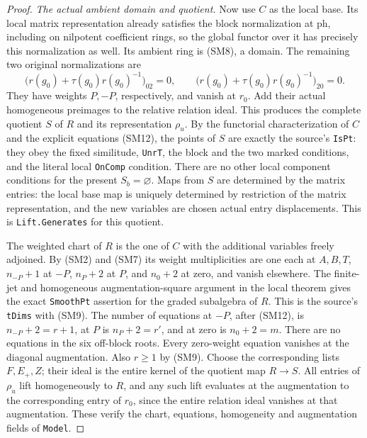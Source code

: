 \begin{proof}
\emph{The actual ambient domain and quotient.}
Now use \(C\) as the local base. Its local matrix
representation already satisfies the block
normalization at \(\mathrm{ph}\), including on
nilpotent coefficient rings, so the global functor
over it has precisely this normalization as well.
Its ambient ring is (SM8), a domain. The remaining
two original normalizations are
\[
 \bigl(r(g_0)+\tau(g_0)r(g_0)^{-1}\bigr)_{02}=0,\qquad
 \bigl(r(g_0)+\tau(g_0)r(g_0)^{-1}\bigr)_{20}=0 .
                                                               \tag{SM12}
\]
They have weights \(P,-P\), respectively, and vanish
at \(r_0\). Add their actual homogeneous preimages
to the relative relation ideal. This produces the
complete quotient \(S\) of \(R\) and its representation
\(\rho_u\). By the functorial characterization of
\(C\) and the explicit equations (SM12), the
points of \(S\) are exactly the source's
\texttt{IsPt}: they obey the fixed similitude,
\texttt{UnrT}, the block and the two marked conditions,
and the literal local \texttt{OnComp} condition.
There are no other local component conditions for
the present \(S_b=\varnothing\).
Maps from \(S\) are determined by the matrix entries:
the local base map is uniquely determined by restriction
of the matrix representation, and the new variables
are chosen actual entry displacements. This is
\texttt{Lift.Generates} for this quotient.

The weighted chart of \(R\) is the one of \(C\)
with the additional variables freely adjoined.
By (SM2) and (SM7) its weight multiplicities are
one each at \(A,B,T\), \(n_{-P}+1\) at \(-P\),
\(n_P+2\) at \(P\), and \(n_0+2\) at zero,
and vanish elsewhere. The finite-jet and homogeneous
augmentation-square argument in the local theorem
gives the exact \texttt{SmoothPt} assertion for the
graded subalgebra of \(R\). This is the source's
\texttt{tDims} with (SM9).
The number of equations at \(-P\), after (SM12),
is \(n_{-P}+2=r+1\), at \(P\) is \(n_P+2=r'\),
and at zero is \(n_0+2=m\). There are no equations
in the six off-block roots. Every zero-weight
equation vanishes at the diagonal augmentation.
Also \(r\ge1\) by (SM9).
Choose the corresponding lists \(F,E_+,Z\);
their ideal is the entire kernel of the quotient
map \(R\to S\). All entries of \(\rho_u\) lift
homogeneously to \(R\), and any such lift evaluates
at the augmentation to the corresponding entry
of \(r_0\), since the entire relation ideal vanishes
at that augmentation. These verify the chart,
equations, homogeneity and augmentation fields of
\texttt{Model}.


\end{proof}

